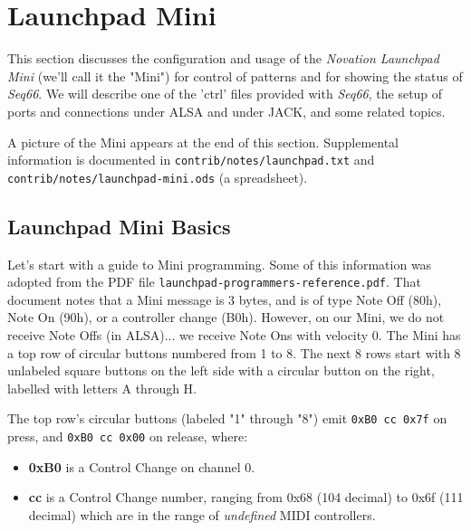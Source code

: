 
%
%
%

\section{Launchpad Mini}
\label{sec:launchpad_mini}

   This section discusses the configuration and usage of the
   \textsl{Novation Launchpad Mini} (we'll call it the "Mini")
   for control of patterns
   and for showing the status of \textsl{Seq66}.
   We will describe one of the 'ctrl' files provided with \textsl{Seq66},
   the setup of ports and connections 
   under ALSA and under JACK, and some related topics.

   A picture of the Mini appears at the end of this section.
   Supplemental information is documented in
   \texttt{contrib/notes/launchpad.txt} and
   \texttt{contrib/notes/launchpad-mini.ods} (a spreadsheet).

\subsection{Launchpad Mini Basics}
\label{subsec:launchpad_mini_basics}

   Let's start with a guide to Mini programming.
   Some of this information was adopted from the PDF file
   \texttt{launchpad-programmers-reference.pdf}.
   That document notes that a Mini
   message is 3 bytes, and is of type Note Off (80h), Note On (90h), or a
   controller change (B0h).  However, on our Mini, we do not receive Note Offs
   (in ALSA)... we receive Note Ons with velocity 0.
   The Mini has a top row of circular buttons numbered from 1 to 8.
   The next 8 rows start with 8 unlabeled square buttons on the left side
   with a circular button on the right, labelled with letters A through H.

   The top row's circular buttons (labeled "1" through "8")
   emit \texttt{0xB0 cc 0x7f} on press, and
   \texttt{0xB0 cc 0x00} on release, where:

   \begin{itemize}
      \item \textbf{0xB0}
         is a Control Change on channel 0.
      \item \textbf{cc}
         is a Control Change number, ranging from 0x68 (104 decimal)
         to 0x6f (111 decimal) which are in the range of
            \textsl{undefined} MIDI controllers.
   \end{itemize}

